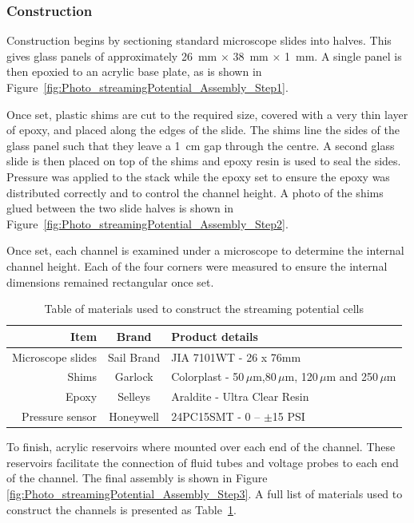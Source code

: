     \subsubsection*{Construction}


      Construction begins by sectioning standard microscope slides into halves.
      This gives glass panels of approximately \SI{26}{\milli\meter} $\times$ \SI{38}{\milli\meter} $\times$ \SI{1}{\milli\meter}.
      A single panel is then epoxied to an acrylic base plate, as is shown in Figure~\ref{fig:Photo_streamingPotential_Assembly_Step1}.

      Once set, plastic shims are cut to the required size, covered with a very thin layer of epoxy, and placed along the edges of the slide.
      The shims line the sides of the glass panel such that they leave a \SI{1}{\centi\meter} gap through the centre.
      A second glass slide is then placed on top of the shims and epoxy resin is used to seal the sides.
      Pressure was applied to the stack while the epoxy set to ensure the epoxy was distributed correctly and to control the channel height.
      A photo of the shims glued between the two slide halves is shown in Figure~\ref{fig:Photo_streamingPotential_Assembly_Step2}.

      Once set, each channel is examined under a microscope to determine the internal channel height.
      Each of the four corners were measured to ensure the internal dimensions remained rectangular once set.

      \begin{table}
        \begin{tabular}{r|c|l}
          Item & Brand & Product details\tabularnewline\hline
          Microscope slides & Sail Brand & JIA 7101WT - 26 x 76mm\tabularnewline
          Shims & Garlock & Colorplast - 50$\,\mu$m,80$\,\mu$m, 120$\,\mu$m and 250$\,\mu$m\tabularnewline
          Epoxy & Selleys & Araldite - Ultra Clear Resin\tabularnewline
          Pressure sensor & Honeywell & 24PC15SMT - 0 -- $\pm$15 PSI\tabularnewline
        \end{tabular}
        \caption{\label{Table_StreamingCell_MaterialsUsed}Table of materials used to construct the streaming potential cells}
      \end{table}

      To finish, acrylic reservoirs where mounted over each end of the channel.
      These reservoirs facilitate the connection of fluid tubes and voltage probes to each end of the channel.
      The final assembly is shown in Figure \ref{fig:Photo_streamingPotential_Assembly_Step3}.
      A full list of materials used to construct the channels is presented as Table~\ref{Table_StreamingCell_MaterialsUsed}.

